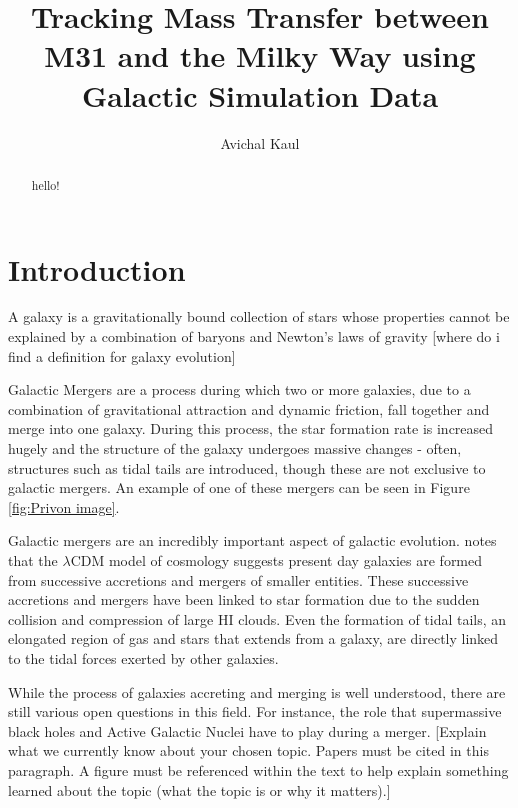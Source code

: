 \documentclass[linenumbers]{aastex631} %
\begin{document}
\title{Tracking Mass Transfer between M31 and the Milky Way using Galactic Simulation Data}




\author{Avichal Kaul}

\begin{abstract}
    hello!
\end{abstract}




\section{Introduction}

A galaxy is a gravitationally bound collection of stars whose properties
cannot be explained by a combination of baryons and Newton’s laws of gravity \citep{Willman_Strader_2012} [where do i find a definition for galaxy evolution]


Galactic Mergers are a process during which two or more galaxies, due to a combination of gravitational attraction and dynamic friction, fall together and merge into one galaxy. During this process, the star formation rate is increased hugely \citep{Moster_2011} and the structure of the galaxy undergoes massive changes - often, structures such as tidal tails are introduced, though these are not exclusive to galactic mergers. An example of one of these mergers can be seen in Figure \ref{fig:Privon image}.


Galactic mergers are an incredibly important aspect of galactic evolution. \citep{1978MNRAS.183..341W} notes that the $\lambda\text{CDM}$ model of cosmology suggests present day galaxies are formed from successive accretions and mergers of smaller entities. These successive accretions and mergers have been linked to star formation \citep{Barnes_2004} due to the sudden collision and compression of large HI clouds. Even the formation of tidal tails, an elongated region of gas and stars that extends from a galaxy, are directly linked to the tidal forces exerted by other galaxies.


While the process of galaxies accreting and merging is well understood, there are still various open questions in this field. For instance, the role that supermassive black holes and Active Galactic Nuclei have to play during a merger. [Explain what we currently know about your chosen topic. Papers must
be cited in this paragraph. A figure must be referenced within the text to help explain
something learned about the topic (what the topic is or why it matters).]
\end{document}
